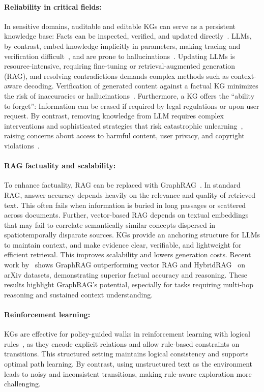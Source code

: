 \documentclass[10pt]{article}
\begin{document}
\paragraph{Reliability in critical fields:}
In sensitive domains, auditable and editable KGs can serve as a persistent knowledge base: Facts can be inspected, verified, and updated directly~\cite{pan_et_al:TGDK}. LLMs, by contrast, embed knowledge implicitly in parameters, making tracing and verification difficult~\cite{akyurek-etal-2022-towards}, and are prone to hallucinations~\cite{Huang_2025_survey}. Updating LLMs is resource-intensive, requiring fine-tuning or retrieval-augmented generation (RAG), and resolving contradictions demands complex methods such as context-aware decoding. Verification of generated content against a factual KG minimizes the risk of inaccuracies or hallucinations~\cite{luo2024rog, hron2024training}. Furthermore, a KG offers the ``ability to forget'': Information can be erased if required by legal regulations or upon user request. By contrast, removing knowledge from LLM requires complex interventions and sophisticated strategies that risk catastrophic unlearning~\cite{si2023knowledgeunlearningllms}, raising concerns about access to harmful content, user privacy, and copyright violations~\cite{tian-etal-2024-forget}.

\paragraph{RAG factuality and scalability:}
To enhance factuality, RAG can be replaced with GraphRAG~\cite{edge2024localglobalgraphrag}. In standard RAG, answer accuracy depends heavily on the relevance and quality of retrieved text. This often fails when information is buried in long passages or scattered across documents. Further, vector-based RAG depends on textual embeddings that may fail to correlate semantically similar concepts dispersed in spatiotemporally disparate sources. KGs provide an anchoring structure for LLMs to maintain context, and make evidence clear, verifiable, and lightweight for efficient retrieval. This improves scalability and lowers generation costs. Recent work by~\citet{brissette2024LLMKG} shows GraphRAG outperforming vector RAG and HybridRAG~\cite{sarmah2024hybridrag} on arXiv datasets, demonstrating superior factual accuracy and reasoning. These results highlight GraphRAG’s potential, especially for tasks requiring multi-hop reasoning and sustained context understanding.

\paragraph{Reinforcement learning:}
KGs are effective for policy-guided walks in reinforcement learning with logical rules~\cite{Uddin2025, 10.1007/978-3-030-77385-4_22}, as they encode explicit relations and allow rule-based constraints on transitions. This structured setting maintains logical consistency and supports optimal path learning. By contrast, using unstructured text as the environment leads to noisy and inconsistent transitions, making rule-aware exploration more challenging.
\end{document}
